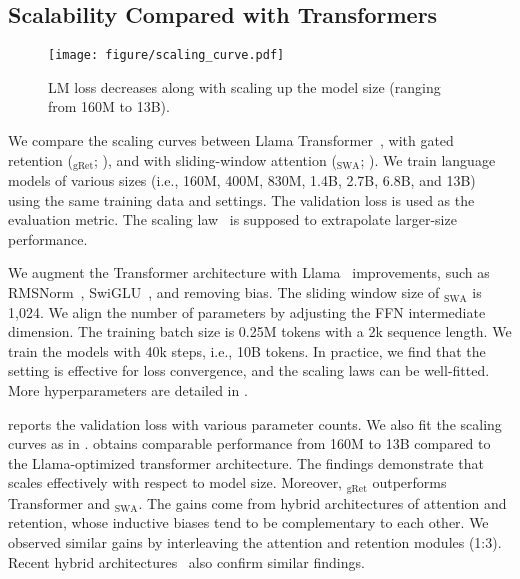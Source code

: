 \subsection{Scalability Compared with Transformers}
\label{sec:scaling}

\begin{wrapfigure}{r}{0.524\textwidth}
\setlength\intextsep{0pt}
\centering
\vspace{-1.5em}
\captionsetup{type=figure}
\texttt{[image: figure/scaling\_curve.pdf]}
\caption{LM loss decreases along with scaling up the model size (ranging from 160M to 13B).}
\vspace{-1.5em}
\label{fig:scaling}
\end{wrapfigure}

We compare the scaling curves between Llama Transformer~\cite{transformer,llama}, \our{} with gated retention (\our{}$_\text{gRet}$; ), and \our{} with sliding-window attention (\our{}$_\text{SWA}$; ).
We train language models of various sizes (i.e., 160M, 400M, 830M, 1.4B, 2.7B, 6.8B, and 13B) using the same training data and settings.
The validation loss is used as the evaluation metric.
The scaling law~\cite{scaling:law} is supposed to extrapolate larger-size performance.

We augment the Transformer architecture with Llama~\cite{llama} improvements, such as RMSNorm~\cite{rmsnorm}, SwiGLU~\cite{glu}, and removing bias.
The sliding window size of \our{}$_\text{SWA}$ is 1,024.
We align the number of parameters by adjusting the FFN intermediate dimension.
The training batch size is 0.25M tokens with a 2k sequence length.
We train the models with 40k steps, i.e., 10B tokens. In practice, we find that the setting is effective for loss convergence, and the scaling laws can be well-fitted.
More hyperparameters are detailed in .

 reports the validation loss with various parameter counts.
We also fit the scaling curves as in \cite{scaling:law}.
\our{} obtains comparable performance from 160M to 13B compared to the Llama-optimized transformer architecture.
The findings demonstrate that \our{} scales effectively with respect to model size.
Moreover, \our{}$_\text{gRet}$ outperforms Transformer and \our{}$_\text{SWA}$.
The gains come from hybrid architectures of attention and retention, whose inductive biases tend to be complementary to each other. We observed similar gains by interleaving the attention and retention modules (1:3). Recent hybrid architectures~\cite{jamba} also confirm similar findings.

